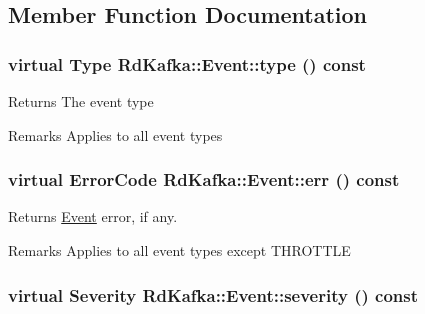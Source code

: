 \subsection{Member Function Documentation}
\hypertarget{classRdKafka_1_1Event_a8bf41860541c6549cccd298b0a4ceb6e}{
\subsubsection[{type}]{\setlength{\rightskip}{0pt plus 5cm}virtual {\bf Type} RdKafka::Event::type () const}}
\label{classRdKafka_1_1Event_a8bf41860541c6549cccd298b0a4ceb6e}
\begin{DoxyReturn}{Returns}
The event type 
\end{DoxyReturn}
\begin{DoxyRemark}{Remarks}
Applies to all event types 
\end{DoxyRemark}
\hypertarget{classRdKafka_1_1Event_a6631f15dccbf775a3fa43a1aba8828ab}{
\subsubsection[{err}]{\setlength{\rightskip}{0pt plus 5cm}virtual ErrorCode RdKafka::Event::err () const}}
\label{classRdKafka_1_1Event_a6631f15dccbf775a3fa43a1aba8828ab}
\begin{DoxyReturn}{Returns}
\hyperlink{classRdKafka_1_1Event}{Event} error, if any. 
\end{DoxyReturn}
\begin{DoxyRemark}{Remarks}
Applies to all event types except THROTTLE 
\end{DoxyRemark}
\hypertarget{classRdKafka_1_1Event_ab98e758dea9aa13eb1421f625e206b16}{
\subsubsection[{severity}]{\setlength{\rightskip}{0pt plus 5cm}virtual {\bf Severity} RdKafka::Event::severity () const}}

